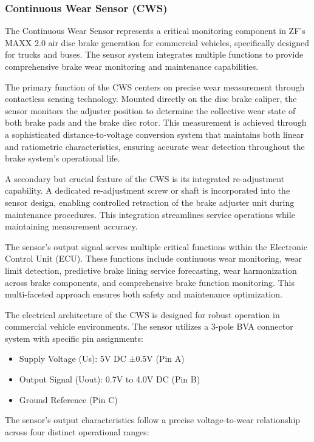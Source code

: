 \documentclass[12pt]{article}
\begin{document}
\subsubsection{Continuous Wear Sensor (CWS)} The Continuous Wear Sensor
represents a critical monitoring component in ZF's MAXX 2.0 air disc brake
generation for commercial vehicles, specifically designed for trucks and buses.
The sensor system integrates multiple functions to provide comprehensive brake
wear monitoring and maintenance capabilities.

The primary function of the CWS centers on precise wear measurement through
contactless sensing technology. Mounted directly on the disc brake caliper, the
sensor monitors the adjuster position to determine the collective wear state of
both brake pads and the brake disc rotor. This measurement is achieved through
a sophisticated distance-to-voltage conversion system that maintains both
linear and ratiometric characteristics, ensuring accurate wear detection
throughout the brake system's operational life.

A secondary but crucial feature of the CWS is its integrated re-adjustment
capability. A dedicated re-adjustment screw or shaft is incorporated into the
sensor design, enabling controlled retraction of the brake adjuster unit during
maintenance procedures. This integration streamlines service operations while
maintaining measurement accuracy.

The sensor's output signal serves multiple critical functions within the
Electronic Control Unit (ECU). These functions include continuous wear
monitoring, wear limit detection, predictive brake lining service forecasting,
wear harmonization across brake components, and comprehensive brake function
monitoring. This multi-faceted approach ensures both safety and maintenance
optimization.

The electrical architecture of the CWS is designed for robust operation in
commercial vehicle environments. The sensor utilizes a 3-pole BVA connector
system with specific pin assignments:

\begin{itemize} \item Supply Voltage (Us): 5V DC ±0.5V (Pin A) \item Output
Signal (Uout): 0.7V to 4.0V DC (Pin B) \item Ground Reference (Pin C)
\end{itemize}

The sensor's output characteristics follow a precise voltage-to-wear
relationship across four distinct operational ranges:
\end{document}
